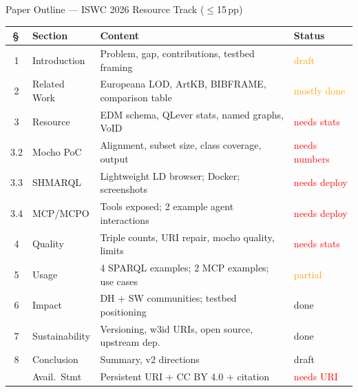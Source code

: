 \documentclass[xcolor,aspectratio=169,compress]{beamer}
\begin{document}
\begin{frame}[shrink=10]{Paper Outline --- ISWC 2026 Resource Track ($\leq$15\,pp)}
  \footnotesize
  \begin{tabular}{clp{6.5cm}l}
    \toprule
    §\, & Section & Content & Status \\
    \midrule
    1   & Introduction  & Problem, gap, contributions, testbed framing       & \textcolor{orange}{draft} \\
    2   & Related Work  & Europeana LOD, ArtKB, BIBFRAME, comparison table   & \textcolor{orange}{mostly done} \\
    3   & Resource      & EDM schema, QLever stats, named graphs, VoID        & \textcolor{red}{needs stats} \\
    3.2 & Mocho PoC     & Alignment, subset size, class coverage, output     & \textcolor{red}{needs numbers} \\
    3.3 & SHMARQL       & Lightweight LD browser; Docker; screenshots         & \textcolor{red}{needs deploy} \\
    3.4 & MCP/MCPO      & Tools exposed; 2 example agent interactions         & \textcolor{red}{needs deploy} \\
    4   & Quality       & Triple counts, URI repair, mocho quality, limits    & \textcolor{red}{needs stats} \\
    5   & Usage         & 4 SPARQL examples; 2 MCP examples; use cases        & \textcolor{orange}{partial} \\
    6   & Impact        & DH + SW communities; testbed positioning            & \textcolor{green!60!black}{done} \\
    7   & Sustainability& Versioning, w3id URIs, open source, upstream dep.\  & \textcolor{green!60!black}{done} \\
    8   & Conclusion    & Summary, v2 directions                              & \textcolor{green!60!black}{draft} \\
        & Avail.\ Stmt  & Persistent URI + CC BY 4.0 + citation               & \textcolor{red}{needs URI} \\
    \bottomrule
  \end{tabular}
\end{frame}
\end{document}
